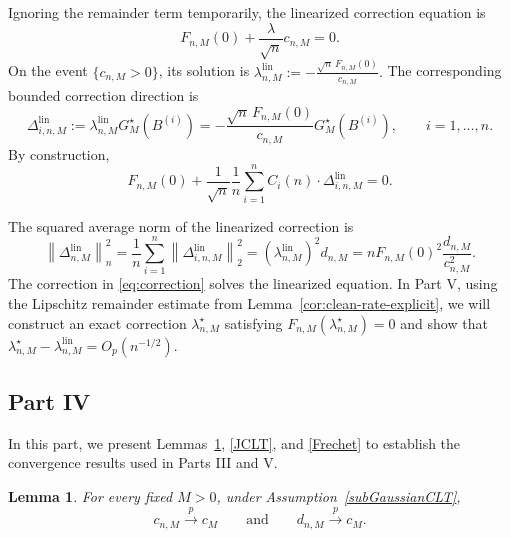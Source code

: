 \documentclass[11pt]{article}
\newtheorem{lemma}{Lemma}
\theoremstyle{definition}
\begin{document}
Ignoring the remainder term temporarily, the linearized correction
equation is
\[
F_{n,M}(0)
+
\frac{\lambda}{\sqrt n}c_{n,M}
=
0.
\]
On the event $\{c_{n,M}>0\}$, its solution is $\lambda_{n,M}^{\mathrm{lin}}
:=
-
\frac{\sqrt n\,F_{n,M}(0)}
{c_{n,M}}.$
The corresponding bounded correction direction is
\begin{equation}\label{eq:correction}
\Delta_{i,n,M}^{\mathrm{lin}}
:=
\lambda_{n,M}^{\mathrm{lin}}
G_M^\star(B^{(i)})
=
-
\frac{\sqrt n\,F_{n,M}(0)}
{c_{n,M}}
G_M^\star(B^{(i)}),
\qquad
i=1,\ldots,n.
\end{equation}
By construction,
\[
F_{n,M}(0)
+
\frac1{\sqrt n}\frac1n
\sum_{i=1}^n
C_i(n)\cdot
\Delta_{i,n,M}^{\mathrm{lin}}
=
0.
\]

The squared average norm of the linearized correction is
\[
\left\|\Delta_{n,M}^{\mathrm{lin}}\right\|_n^2
=
\frac{1}{n}\sum_{i=1}^n
\left\|\Delta_{i,n,M}^{\mathrm{lin}}\right\|_2^2
=
\left(\lambda_{n,M}^{\mathrm{lin}}\right)^2 d_{n,M}
=
nF_{n,M}(0)^2\frac{d_{n,M}}{c_{n,M}^2}.
\]
The correction in \eqref{eq:correction} solves the linearized equation.
In Part V, using the Lipschitz remainder estimate from
Lemma~\ref{cor:clean-rate-explicit}, we will construct an exact
correction $\lambda_{n,M}^\star$ satisfying $F_{n,M}(\lambda_{n,M}^\star)=0$
and show that $\lambda_{n,M}^\star
-
\lambda_{n,M}^{\mathrm{lin}}
=
O_p(n^{-1/2}).$

\subsection{Part IV}

In this part, we present
Lemmas~\ref{convergetoc}, \ref{JCLT}, and \ref{Frechet}
to establish the convergence results used in Parts III and V.

\begin{lemma}\label{convergetoc}
For every fixed $M>0$, under Assumption~\ref{subGaussianCLT},
\[
c_{n,M}\xrightarrow{p}c_M
\qquad\text{and}\qquad
d_{n,M}\xrightarrow{p}c_M.
\]
\end{lemma}
\end{document}
